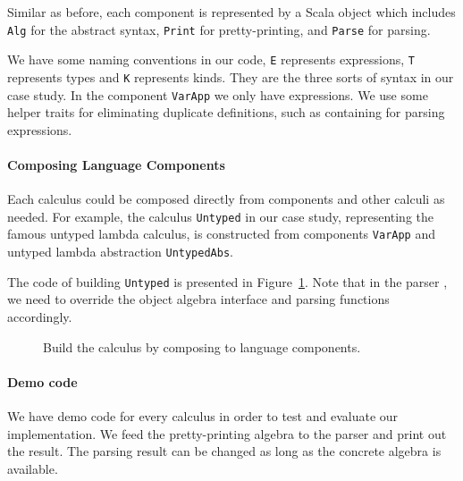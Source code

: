 Similar as before, each component is represented by a Scala object which includes \lstinline{Alg} for the abstract syntax, \lstinline{Print} for pretty-printing, and \lstinline{Parse} for parsing.

We have some naming conventions in our code, \lstinline{E} represents
expressions, \lstinline{T} represents types and \lstinline{K}
represents kinds. They are the three sorts of syntax in our case study.
In the component \lstinline{VarApp} we only have expressions. We use some helper traits for eliminating duplicate definitions, such as  containing  for parsing expressions.


\paragraph{Composing Language Components}
Each calculus could be composed directly from components and other
calculi as needed. For example, the calculus \lstinline{Untyped} in our case study,
representing the famous untyped lambda calculus, is constructed from components \lstinline{VarApp}
and untyped lambda abstraction \lstinline{UntypedAbs}.

The code of building \lstinline{Untyped} is presented in Figure~\ref{fig:casestudy-untyped}. Note that in the parser , we need to override the object algebra interface and
parsing functions accordingly.

\begin{figure}[t]
\caption{Build the  calculus by composing to language components.}\label{fig:casestudy-untyped}
\end{figure}

\paragraph{Demo code}
We have demo code for every calculus in order to test and evaluate our implementation.
We feed the pretty-printing algebra to the parser and print out the result.
The parsing result can be changed as long as the concrete algebra is available.


